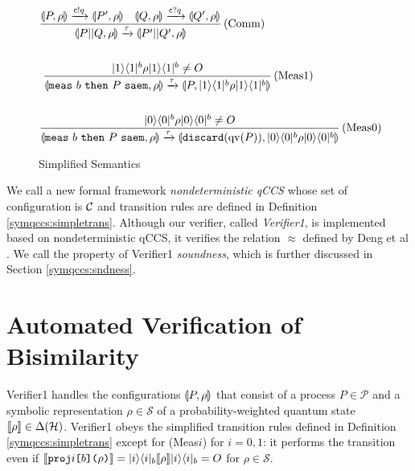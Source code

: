 \begin{defi}
\begin{figure}[htbp]
\begin{align*}
 &\frac{
 \llparenthesis P, \rho \rrparenthesis \xrightarrow{\mathsf{c}! q} 
 \llparenthesis P', \rho \rrparenthesis~~~
 \llparenthesis Q, \rho \rrparenthesis \xrightarrow{\mathsf{c}? q} 
 \llparenthesis Q', \rho \rrparenthesis
 }
 {
 \llparenthesis P||Q, \rho \rrparenthesis \xrightarrow{\tau} 
 \llparenthesis P'||Q', \rho \rrparenthesis
 }\,\mbox{(Comm)}\\
\\
&~\frac{ |1\rangle\langle 1|^{b} \rho |1\rangle\langle 1|^{b} \neq O
}
{
\llparenthesis {\tt meas}~b~{\tt then}~P~{\tt saem}, \rho \rrparenthesis \xrightarrow{\tau}
\llparenthesis P, |1\rangle\langle 1|^{b} \rho |1\rangle\langle 1|^{b} \rrparenthesis
}\,\mbox{(Meas1)}\\
\\
&\frac{ |0\rangle\langle 0|^{b} \rho |0\rangle\langle 0|^{b} \neq O
}
{
\llparenthesis {\tt meas}~b~{\tt then}~P~{\tt saem}, \rho \rrparenthesis \xrightarrow{\tau}
\llparenthesis \mathtt{discard(} \mathrm{qv}(P) \mathtt{)}, |0\rangle\langle 0|^{b} \rho |0\rangle\langle 0|^{b} \rrparenthesis
}\,\mbox{(Meas0)}
 \end{align*}
\caption{Simplified Semantics}
\label{fig:simplified-semantics}
\end{figure}
\end{defi}
We call a new formal framework {\it nondeterministic qCCS}
whose set of configuration is $\mathcal{C}$ and transition rules are defined in
Definition \ref{symqccs:simpletrans}. Although our verifier, 
called \emph{Verifier1}, is
implemented based on nondeterministic qCCS, it verifies the
relation $\approx$ defined by Deng et al \cite{DengFeng2012}.
We call the property of Verifier1 \emph{soundness}, which is
further discussed in Section \ref{symqccs:sndness}.

\section{Automated Verification of Bisimilarity}
Verifier1 handles the configurations $\llparenthesis P, \rho \rrparenthesis$ that consist
of a process $P \in \mathcal{P}$ and a symbolic representation
$\rho \in \mathcal{S}$ of a probability-weighted quantum state $[\![\rho]\!] \in
\Delta(\mathcal{H})$. Verifier1 obeys the simplified transition rules
defined in Definition \ref{symqccs:simpletrans} except for (Meas$i$)
for $i = 0,1$: it performs the transition even if 
$ [\![\mathtt{proj}i\texttt{[}b\texttt{]}\texttt{(}\rho\texttt{)}]\!] = 
|i\rangle\langle i|_b [\![\rho]\!]|i\rangle\langle i|_b
= O$ for $\rho \in \mathcal{S}$.

